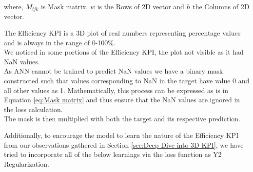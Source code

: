 \documentclass{report} %
\begin{document}
where, \(M_{ijk}\) is Mask matrix, \(w\) is the Rows of 2\ac{D} vector and \(h\) the Columns of 2\ac{D} vector.

The Efficiency \ac{KPI} is a 3\ac{D} plot of real numbers representing percentage values and is always in the range of 0-100\%.\\
We noticed in some portions of the Efficiency \ac{KPI}, the plot not visible as it had \ac{NaN} values.\\
As ANN cannot be trained to predict \ac{NaN} values we have a binary mask constructed such that values corresponding to \ac{NaN} in the target have value 0 and all other values as 1.
Mathematically, this process can be expressed as is in Equation \ref{eq:Mask matrix} and thus ensure that the \ac{NaN} values are ignored in the loss calculation. \\ 
The mask is then multiplied with both the target and its respective prediction. 

Additionally, to encourage the model to learn the nature of the Efficiency \ac{KPI} from our observations gathered in Section \ref{sec:Deep Dive into 3D KPI}, we have tried to incorporate all of the below learnings via the loss function as Y2 Regularization.\\
\end{document}
